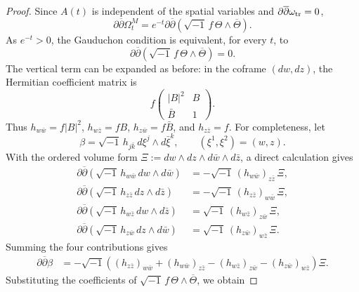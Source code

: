 \documentclass[12pt]{amsart}
\numberwithin{equation}{section}
\theoremstyle{remark}
\theoremstyle{definition}
\begin{document}
\begin{proof}
Since $A(t)$ is independent of the spatial variables and $\partial\overline{\partial}\omega_{\rm tr}=0$,
\begin{equation*}
\partial\overline{\partial}\Omega_t^M
=
e^{-t}
\partial\overline{\partial}
\left(
\sqrt{-1}\,f\,\Theta\wedge\overline{\Theta}
\right).
\end{equation*}
As $e^{-t}>0$, the Gauduchon condition is equivalent, for every $t$, to
\begin{equation*}
\partial\overline{\partial}
\left(
\sqrt{-1}\,f\,\Theta\wedge\overline{\Theta}
\right)
=0.
\end{equation*}
The vertical term can be expanded as before:
in the coframe $(dw,dz)$, the Hermitian coefficient matrix is
\begin{equation*}
f
\begin{pmatrix}
|B|^2 & B\\
\bar B & 1
\end{pmatrix}.
\end{equation*}
Thus $h_{w\bar w}=f|B|^2$, $h_{w\bar z}=fB$, $h_{z\bar w}=f\bar B$, and $h_{z\bar z}=f$.
For completeness, let
\begin{equation*}
\beta=\sqrt{-1}\,h_{j\bar k}\,d\xi^j\wedge d\bar\xi^k,\qquad (\xi^1,\xi^2)=(w,z).
\end{equation*}
With the ordered volume form $\Xi:=dw\wedge dz\wedge d\bar w\wedge d\bar z$, a direct calculation gives
\begin{align*}
\partial\overline{\partial}
\left(\sqrt{-1}\,h_{w\bar w}\,dw\wedge d\bar w\right)
&=
-\sqrt{-1}\,(h_{w\bar w})_{z\bar z}\,\Xi,\\
\partial\overline{\partial}
\left(\sqrt{-1}\,h_{z\bar z}\,dz\wedge d\bar z\right)
&=
-\sqrt{-1}\,(h_{z\bar z})_{w\bar w}\,\Xi,\\
\partial\overline{\partial}
\left(\sqrt{-1}\,h_{w\bar z}\,dw\wedge d\bar z\right)
&=
\sqrt{-1}\,(h_{w\bar z})_{z\bar w}\,\Xi,\\
\partial\overline{\partial}
\left(\sqrt{-1}\,h_{z\bar w}\,dz\wedge d\bar w\right)
&=
\sqrt{-1}\,(h_{z\bar w})_{w\bar z}\,\Xi.
\end{align*}
Summing the four contributions gives
\begin{align*}
\partial\overline{\partial}\beta
&=
-\sqrt{-1}
\left(
(h_{z\bar z})_{w\bar w}
+
(h_{w\bar w})_{z\bar z}
-
(h_{w\bar z})_{z\bar w}
-
(h_{z\bar w})_{w\bar z}
\right)\Xi.
\end{align*}
Substituting the coefficients of
$\sqrt{-1}\,f\,\Theta\wedge\overline{\Theta}$, we obtain

\end{proof}
\end{document}
